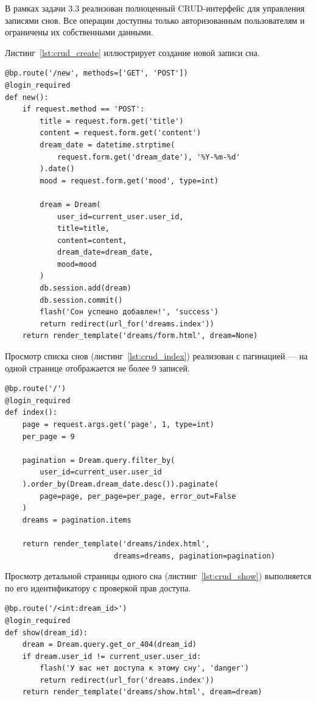 \documentclass[14pt, a4paper]{extarticle}
\begin{document}
В рамках задачи 3.3 реализован полноценный CRUD-интерфейс для управления записями снов. Все операции доступны только авторизованным пользователям и ограничены их собственными данными.


Листинг~\ref{lst:crud_create} иллюстрирует создание новой записи сна.

\begin{lstlisting}[caption={Создание сна}, label={lst:crud_create}]
@bp.route('/new', methods=['GET', 'POST'])
@login_required
def new():
    if request.method == 'POST':
        title = request.form.get('title')
        content = request.form.get('content')
        dream_date = datetime.strptime(
            request.form.get('dream_date'), '%Y-%m-%d'
        ).date()
        mood = request.form.get('mood', type=int)

        dream = Dream(
            user_id=current_user.user_id,
            title=title,
            content=content,
            dream_date=dream_date,
            mood=mood
        )
        db.session.add(dream)
        db.session.commit()
        flash('Сон успешно добавлен!', 'success')
        return redirect(url_for('dreams.index'))
    return render_template('dreams/form.html', dream=None)
\end{lstlisting}


Просмотр списка снов (листинг~\ref{lst:crud_index}) реализован с пагинацией — на одной странице отображается не более 9 записей.

\begin{lstlisting}[caption={Просмотр списка снов}, label={lst:crud_index}]
@bp.route('/')
@login_required
def index():
    page = request.args.get('page', 1, type=int)
    per_page = 9
    
    pagination = Dream.query.filter_by(
        user_id=current_user.user_id
    ).order_by(Dream.dream_date.desc()).paginate(
        page=page, per_page=per_page, error_out=False
    )
    dreams = pagination.items
    
    return render_template('dreams/index.html', 
                         dreams=dreams, pagination=pagination)
\end{lstlisting}

Просмотр детальной страницы одного сна (листинг~\ref{lst:crud_show}) выполняется по его идентификатору с проверкой прав доступа.

\begin{lstlisting}[caption={Просмотр одного сна}, label={lst:crud_show}]
@bp.route('/<int:dream_id>')
@login_required
def show(dream_id):
    dream = Dream.query.get_or_404(dream_id)
    if dream.user_id != current_user.user_id:
        flash('У вас нет доступа к этому сну', 'danger')
        return redirect(url_for('dreams.index'))
    return render_template('dreams/show.html', dream=dream)
\end{lstlisting}
\end{document}
